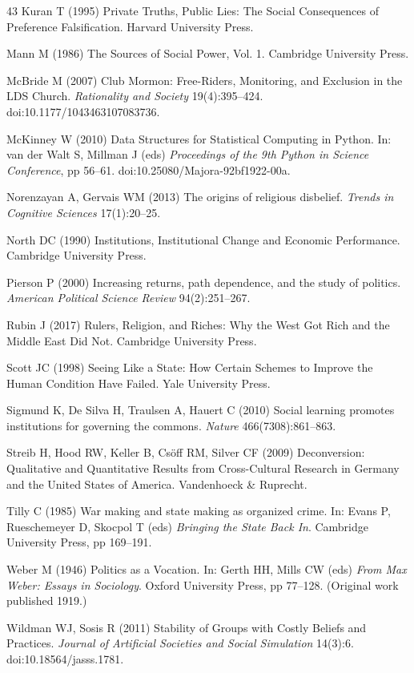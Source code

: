 \documentclass[12pt]{article}
\begin{document}
\begin{thebibliography}{43}
Kuran T (1995) Private Truths, Public Lies: The Social Consequences of Preference Falsification. Harvard University Press.

Mann M (1986) The Sources of Social Power, Vol. 1. Cambridge University Press.

McBride M (2007) Club Mormon: Free-Riders, Monitoring, and Exclusion in the LDS Church. \textit{Rationality and Society} 19(4):395--424. doi:10.1177/1043463107083736.

McKinney W (2010) Data Structures for Statistical Computing in Python. In: van der Walt S, Millman J (eds) \textit{Proceedings of the 9th Python in Science Conference}, pp 56--61. doi:10.25080/Majora-92bf1922-00a.

Norenzayan A, Gervais WM (2013) The origins of religious disbelief. \textit{Trends in Cognitive Sciences} 17(1):20--25.

North DC (1990) Institutions, Institutional Change and Economic Performance. Cambridge University Press.

Pierson P (2000) Increasing returns, path dependence, and the study of politics. \textit{American Political Science Review} 94(2):251--267.

Rubin J (2017) Rulers, Religion, and Riches: Why the West Got Rich and the Middle East Did Not. Cambridge University Press.

Scott JC (1998) Seeing Like a State: How Certain Schemes to Improve the Human Condition Have Failed. Yale University Press.

Sigmund K, De Silva H, Traulsen A, Hauert C (2010) Social learning promotes institutions for governing the commons. \textit{Nature} 466(7308):861--863.

Streib H, Hood RW, Keller B, Cs\"off RM, Silver CF (2009) Deconversion: Qualitative and Quantitative Results from Cross-Cultural Research in Germany and the United States of America. Vandenhoeck \& Ruprecht.

Tilly C (1985) War making and state making as organized crime. In: Evans P, Rueschemeyer D, Skocpol T (eds) \textit{Bringing the State Back In}. Cambridge University Press, pp 169--191.

Weber M (1946) Politics as a Vocation. In: Gerth HH, Mills CW (eds) \textit{From Max Weber: Essays in Sociology}. Oxford University Press, pp 77--128. (Original work published 1919.)

Wildman WJ, Sosis R (2011) Stability of Groups with Costly Beliefs and Practices. \textit{Journal of Artificial Societies and Social Simulation} 14(3):6. doi:10.18564/jasss.1781.

\end{thebibliography}
\end{document}
